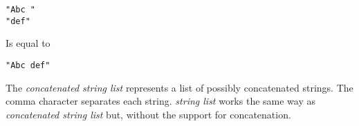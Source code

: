 \begin{lstlisting}[style = SrtL]
"Abc "
"def"
\end{lstlisting}

Is equal to 

\begin{lstlisting}[style = SrtL]
"Abc def"
\end{lstlisting}

The \textit{concatenated string list} represents a list of possibly 
concatenated strings. The comma character separates each string. 
\textit{string list} works the same way as \textit{concatenated string list} 
but, without the support for concatenation.